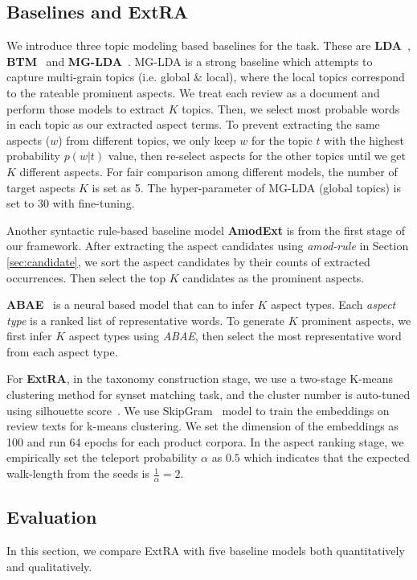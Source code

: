 \documentclass[11pt,a4paper]{article}
\newcommand{\secref}[1]{Section \ref{#1}}
\begin{document}
\subsection{Baselines and ExtRA}
\label{sec:base}
We introduce three topic modeling based baselines for the task.
These are \textbf{LDA}~\cite{Blei2003LatentDA}, 
\textbf{BTM}~\cite{cheng2014btm} and  
\textbf{MG-LDA}~\cite{titov2008modeling}. MG-LDA is a strong
baseline which attempts to capture multi-grain topics (i.e. global \& local), where the local topics correspond to the rateable prominent aspects.
We treat each review as a document and perform those models
to extract $K$ topics.
Then, we select most probable words in 
each topic as our extracted aspect terms. 
To prevent extracting the same aspects ($w$) from different topics, 
we only keep $w$ for the topic $t$ with the highest 
probability $p(w|t)$ value, then re-select aspects for the other 
topics until we get $K$ different aspects. 
For fair comparison among different models, the number of 
target aspects $K$ is set as 5. The hyper-parameter of 
MG-LDA (global topics) is set to 30 with fine-tuning.

Another syntactic rule-based baseline model 
\textbf{AmodExt} is from the first stage of our framework. 
After extracting the aspect candidates using
\emph{amod-rule} in \secref{sec:candidate}, 
we sort the aspect candidates by 
their counts of extracted occurrences. 
Then select the top $K$ 
candidates as the prominent aspects.

\textbf{ABAE}~\cite{DBLP:conf/acl/HeLND17}  is a neural based model that can
to infer $K$ aspect types. 
Each \emph{aspect type} is a ranked list of representative words.
To generate $K$ prominent aspects, 
we first infer $K$ aspect types using \emph{ABAE}, 
then select the most representative word from each
aspect type. 

For \textbf{ExtRA}, in the taxonomy construction stage, 
we use a two-stage K-means clustering method for synset matching task, 
and the cluster number
is auto-tuned using silhouette score~\cite{rousseeuw1987silhouettes}.
We use SkipGram~\cite{miko} model to train the embeddings
on review texts for k-means clustering. 
We set the dimension of the embeddings as 100
and run 64 epochs for each product corpora. 
In the aspect ranking stage, 
we empirically set the teleport probability $\alpha$
as $0.5$ which indicates that the expected walk-length
from the seeds is $\frac{1}{\alpha}=2$.


\subsection{Evaluation}
\label{sec:endeval}
In this section, we compare ExtRA with five baseline models 
both quantitatively and qualitatively.
\end{document}
